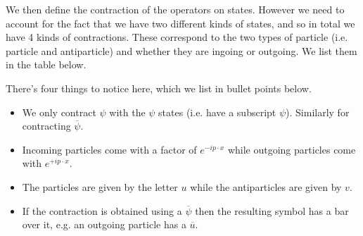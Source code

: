 We then define the contraction of the operators on states. However we need to account for the fact that we have two different kinds of states, and so in total we have 4 kinds of contractions. These correspond to the two types of particle (i.e. particle and antiparticle) and whether they are ingoing or outgoing. We list them in the table below. 

There's four things to notice here, which we list in bullet points below. 
\begin{itemize}
    \item We only contract $\psi$ with the $\psi$ states (i.e. have a subscript $\psi$). Similarly for contracting $\overline{\psi}$. 
    \item Incoming particles come with a factor of $e^{-ip\cdot x}$ while outgoing particles come with $e^{+ip\cdot x}$.
    \item The particles are given by the letter $u$ while the antiparticles are given by $v$. 
    \item If the contraction is obtained using a $\overline{\psi}$ then the resulting symbol has a bar over it, e.g. an outgoing particle has a $\overline{u}$.
\end{itemize}

